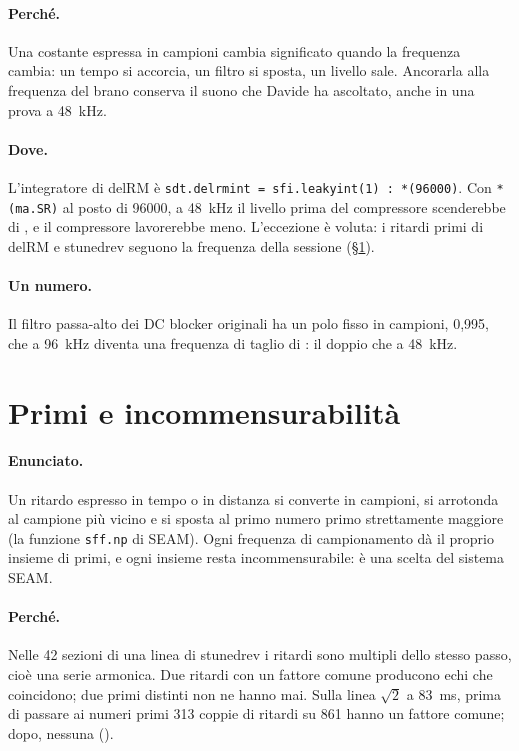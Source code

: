 \paragraph{Perché.}
Una costante espressa in campioni cambia significato quando la frequenza cambia: un tempo si accorcia, un filtro si sposta, un livello sale.
Ancorarla alla frequenza del brano conserva il suono che Davide ha ascoltato, anche in una prova a \qty{48}{\kilo\hertz}.

\paragraph{Dove.}
L'integratore di delRM è \texttt{sdt.delrmint = sfi.leakyint(1) : *(96000)}.
Con \texttt{*(ma.SR)} al posto di 96000, a \qty{48}{\kilo\hertz} il livello prima del compressore scenderebbe di , e il compressore lavorerebbe meno.
L'eccezione è voluta: i ritardi primi di delRM e stunedrev seguono la frequenza della sessione (\S\ref{sec:principio-primi}).

\paragraph{Un numero.}
Il filtro passa-alto dei DC blocker originali ha un polo fisso in campioni, 0,995, che a \qty{96}{\kilo\hertz} diventa una frequenza di taglio di : il doppio che a \qty{48}{\kilo\hertz}.

\section{Primi e incommensurabilità}\label{sec:principio-primi}
\paragraph{Enunciato.}
Un ritardo espresso in tempo o in distanza si converte in campioni, si arrotonda al campione più vicino e si sposta al primo numero primo strettamente maggiore (la funzione \texttt{sff.np} di SEAM).
Ogni frequenza di campionamento dà il proprio insieme di primi, e ogni insieme resta incommensurabile: è una scelta del sistema SEAM.

\paragraph{Perché.}
Nelle 42 sezioni di una linea di stunedrev i ritardi sono multipli dello stesso passo, cioè una serie armonica.
Due ritardi con un fattore comune producono echi che coincidono; due primi distinti non ne hanno mai.
Sulla linea $\sqrt{2}$ a \qty{83}{\milli\second}, prima di passare ai numeri primi 313 coppie di ritardi su 861 hanno un fattore comune; dopo, nessuna ().

